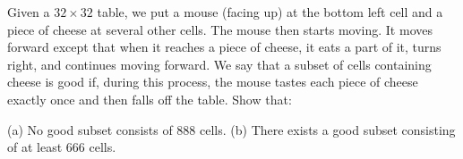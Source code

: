 Given a $32 \times 32$ table, we put a mouse (facing up) at the bottom left cell and a piece of cheese at several other cells.  The mouse then starts moving.  It moves forward except that when it reaches a piece of cheese, it eats a part of it, turns right, and continues moving forward.  We say that a subset of cells containing cheese is good if, during this process, the mouse tastes each piece of cheese exactly once and then falls off the table.  Show that:

(a) No good subset consists of 888 cells.
(b) There exists a good subset consisting of at least 666 cells.